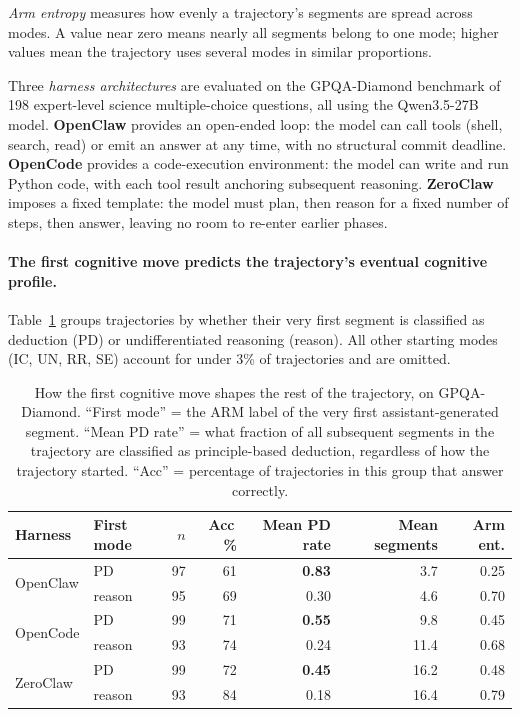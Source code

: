 \emph{Arm entropy} measures how evenly a trajectory's segments are spread
across modes. A value near zero means nearly all segments belong to one
mode; higher values mean the trajectory uses several modes in similar
proportions.

Three \emph{harness architectures} are evaluated on the GPQA-Diamond
benchmark of 198 expert-level science multiple-choice questions, all using
the Qwen3.5-27B model.
\textbf{OpenClaw} provides an open-ended loop: the model can call tools
(shell, search, read) or emit an answer at any time, with no structural
commit deadline.
\textbf{OpenCode} provides a code-execution environment: the model can write
and run Python code, with each tool result anchoring subsequent reasoning.
\textbf{ZeroClaw} imposes a fixed template: the model must plan, then
reason for a fixed number of steps, then answer, leaving no room to re-enter
earlier phases.

\paragraph{The first cognitive move predicts the trajectory's eventual
cognitive profile.}

Table~\ref{tab:arm-first-mode} groups trajectories by whether their very
first segment is classified as deduction (PD) or undifferentiated reasoning
(reason).
All other starting modes (IC, UN, RR, SE) account for under 3\% of
trajectories and are omitted.

\begin{table}[t]
\centering
\small
\caption{%
  How the first cognitive move shapes the rest of the trajectory, on
  GPQA-Diamond.
  ``First mode'' = the ARM label of the very first assistant-generated
  segment.
  ``Mean PD rate'' = what fraction of all subsequent segments in the
  trajectory are classified as principle-based deduction, regardless of
  how the trajectory started.
  ``Acc'' = percentage of trajectories in this group that answer correctly.
}
\label{tab:arm-first-mode}
\setlength{\tabcolsep}{3.5pt}
\begin{tabular}{llrrrrr}
\toprule
Harness & First mode & $n$ & Acc\,\% & Mean PD rate & Mean segments & Arm ent. \\
\midrule
\multirow{2}{*}{OpenClaw}
  & PD     &  97 & 61 & \textbf{0.83} &  3.7 & 0.25 \\
  & reason &  95 & 69 & 0.30          &  4.6 & 0.70 \\
\midrule
\multirow{2}{*}{OpenCode}
  & PD     &  99 & 71 & \textbf{0.55} &  9.8 & 0.45 \\
  & reason &  93 & 74 & 0.24          & 11.4 & 0.68 \\
\midrule
\multirow{2}{*}{ZeroClaw}
  & PD     &  99 & 72 & \textbf{0.45} & 16.2 & 0.48 \\
  & reason &  93 & 84 & 0.18          & 16.4 & 0.79 \\
\bottomrule
\end{tabular}
\end{table}


